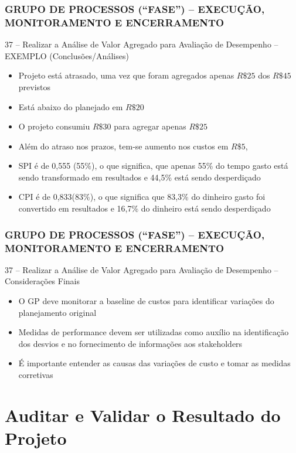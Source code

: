 \begin{frame}
 \frametitle{GRUPO DE PROCESSOS (“FASE”) – \small{EXECUÇÃO, MONITORAMENTO E ENCERRAMENTO}}
 37 – Realizar a Análise de Valor Agregado para Avaliação de Desempenho – EXEMPLO (Conclusões/Análises)
  \begin{itemize}
   \item Projeto está atrasado, uma vez que foram agregados apenas $R\$25$ dos $R\$45$ previstos
    \item Está abaixo do planejado em  $R\$20$
    \item O projeto consumiu $R\$30$ para agregar apenas $R\$25$
    \item Além do atraso nos prazos, tem-se aumento nos custos em $R\$5$, 
    \item SPI é de 0,555 (55\%), o que significa, que apenas 55\% do tempo gasto está sendo transformado em resultados e 44,5\% está sendo desperdiçado
    \item CPI é de 0,833(83\%), o que significa que 83,3\% do dinheiro gasto foi convertido em resultados e 16,7\% do dinheiro está sendo desperdiçado
  \end{itemize}
\end{frame}

\begin{frame}
 \frametitle{GRUPO DE PROCESSOS (“FASE”) – \small{EXECUÇÃO, MONITORAMENTO E ENCERRAMENTO}}
 37 – Realizar a Análise de Valor Agregado para Avaliação de Desempenho – Considerações Finais
  \begin{itemize}
   \item O GP deve monitorar a baseline de custos para identificar variações do planejamento original
    \item Medidas de performance devem ser utilizadas como auxílio na identificação dos desvios e no fornecimento de informações aos stakeholders
    \item É importante entender as causas das variações de custo e tomar as medidas corretivas
  \end{itemize}
\end{frame}

\section{Auditar e Validar o Resultado do Projeto }

